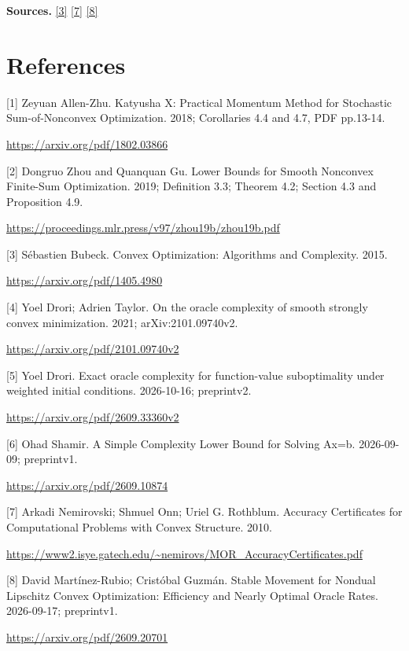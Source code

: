 \documentclass[10pt,a4paper]{article}
\begin{document}
\textbf{Sources.} \href{https://arxiv.org/pdf/1405.4980}{[3]} \href{https://www2.isye.gatech.edu/~nemirovs/MOR_AccuracyCertificates.pdf}{[7]} \href{https://arxiv.org/pdf/2609.20701}{[8]}

\section{References}
[1] Zeyuan Allen-Zhu. Katyusha X: Practical Momentum Method for Stochastic Sum-of-Nonconvex Optimization. 2018; Corollaries 4.4 and 4.7, PDF pp.13-14.

\url{https://arxiv.org/pdf/1802.03866}

[2] Dongruo Zhou and Quanquan Gu. Lower Bounds for Smooth Nonconvex Finite-Sum Optimization. 2019; Definition 3.3; Theorem 4.2; Section 4.3 and Proposition 4.9.

\url{https://proceedings.mlr.press/v97/zhou19b/zhou19b.pdf}

[3] Sébastien Bubeck. Convex Optimization: Algorithms and Complexity. 2015.

\url{https://arxiv.org/pdf/1405.4980}

[4] Yoel Drori; Adrien Taylor. On the oracle complexity of smooth strongly convex minimization. 2021; arXiv:2101.09740v2.

\url{https://arxiv.org/pdf/2101.09740v2}

[5] Yoel Drori. Exact oracle complexity for function-value suboptimality under weighted initial conditions. 2026-10-16; preprintv2.

\url{https://arxiv.org/pdf/2609.33360v2}

[6] Ohad Shamir. A Simple Complexity Lower Bound for Solving Ax=b. 2026-09-09; preprintv1.

\url{https://arxiv.org/pdf/2609.10874}

[7] Arkadi Nemirovski; Shmuel Onn; Uriel G. Rothblum. Accuracy Certificates for Computational Problems with Convex Structure. 2010.

\url{https://www2.isye.gatech.edu/~nemirovs/MOR_AccuracyCertificates.pdf}

[8] David Martínez-Rubio; Cristóbal Guzmán. Stable Movement for Nondual Lipschitz Convex Optimization: Efficiency and Nearly Optimal Oracle Rates. 2026-09-17; preprintv1.

\url{https://arxiv.org/pdf/2609.20701}
\end{document}
